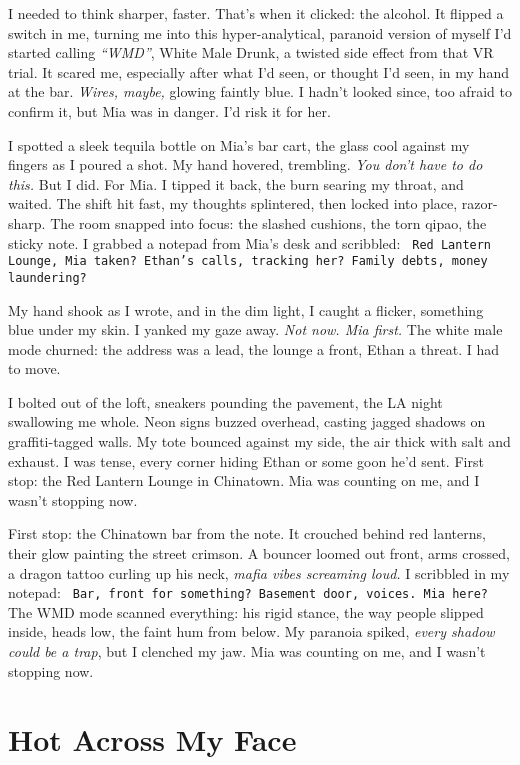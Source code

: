 \documentclass[12pt]{article} %
\newcommand{\note}[1]{\texttt{\small \color{DarkGray} #1}}
\begin{document}
I needed to think sharper, faster. That’s when it clicked: the alcohol. It flipped a switch in me, turning me into this hyper-analytical, paranoid version of myself I’d started calling \textit{“WMD”}, White Male Drunk, a twisted side effect from that VR trial. It scared me, especially after what I’d seen, or thought I’d seen, in my hand at the bar. \textit{Wires, maybe,} glowing faintly blue. I hadn’t looked since, too afraid to confirm it, but \textnormal{Mia} was in danger. I’d risk it for her.

I spotted a sleek tequila bottle on \textnormal{Mia}’s bar cart, the glass cool against my fingers as I poured a shot. My hand hovered, trembling. \textit{You don’t have to do this.} But I did. For \textnormal{Mia}. I tipped it back, the burn searing my throat, and waited. The shift hit fast, my thoughts splintered, then locked into place, razor-sharp. The room snapped into focus: the slashed cushions, the torn qipao, the sticky note. I grabbed a notepad from \textnormal{Mia}’s desk and scribbled: \note{Red Lantern Lounge, Mia taken? Ethan’s calls, tracking her? Family debts, money laundering?}

My hand shook as I wrote, and in the dim light, I caught a flicker, something blue under my skin. I yanked my gaze away. \textit{Not now. Mia first.} The white male mode churned: the address was a lead, the lounge a front, \textnormal{Ethan} a threat. I had to move.

I bolted out of the loft, sneakers pounding the pavement, the LA night swallowing me whole. Neon signs buzzed overhead, casting jagged shadows on graffiti-tagged walls. My tote bounced against my side, the air thick with salt and exhaust. I was tense, every corner hiding \textnormal{Ethan} or some goon he’d sent. First stop: the Red Lantern Lounge in Chinatown. \textnormal{Mia} was counting on me, and I wasn’t stopping now.

First stop: the Chinatown bar from the note. It crouched behind red lanterns, their glow painting the street crimson. A bouncer loomed out front, arms crossed, a dragon tattoo curling up his neck, \textit{mafia vibes screaming loud.} I scribbled in my notepad: \note{Bar, front for something? Basement door, voices. Mia here?} The WMD mode scanned everything: his rigid stance, the way people slipped inside, heads low, the faint hum from below. My paranoia spiked, \textit{every shadow could be a trap}, but I clenched my jaw. \textnormal{Mia} was counting on me, and I wasn’t stopping now.

\section{Hot Across My Face}
\end{document}
